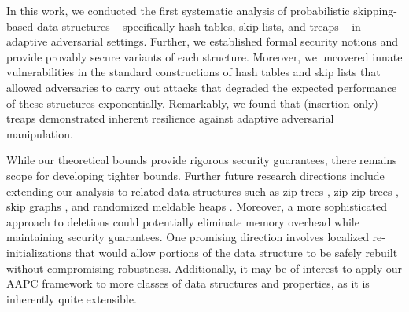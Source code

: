 In this work, we conducted the first systematic analysis of probabilistic skipping-based data structures -- specifically hash tables, skip lists, and treaps -- in adaptive adversarial settings. Further, we established formal security notions and provide provably secure variants of each structure. Moreover, we uncovered innate vulnerabilities in the standard constructions of hash tables and skip lists that allowed adversaries to carry out attacks that degraded the expected performance of these structures exponentially.  Remarkably, we found that (insertion-only) treaps demonstrated inherent resilience against adaptive adversarial manipulation.

While our theoretical bounds provide rigorous security guarantees, there remains scope for developing tighter bounds. Further future research directions include extending our analysis to related data structures such as zip trees \cite{tarjan2021zip}, zip-zip trees \cite{gila2023zip}, skip graphs \cite{aspnes2007skip}, and randomized meldable heaps \cite{gambin1998randomized}. Moreover, a more sophisticated approach to deletions could potentially eliminate memory overhead while maintaining security guarantees. One promising direction involves localized re-initializations that would allow portions of the data structure to be safely rebuilt without compromising robustness. Additionally, it may be of interest to apply our AAPC framework to more classes of data structures and properties, as it is inherently quite extensible.